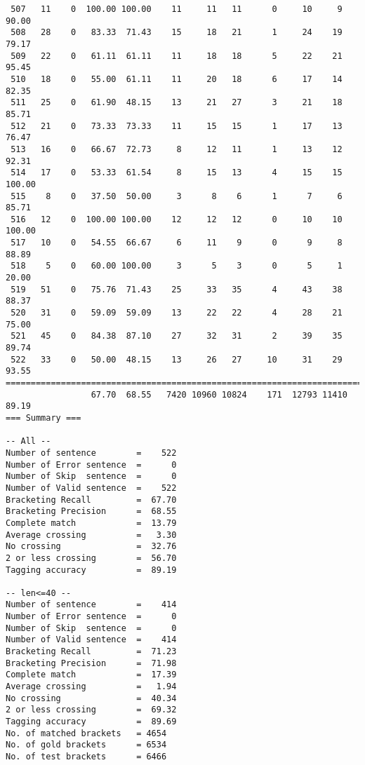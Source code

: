 \begin{verbatim}
 507   11    0  100.00 100.00    11     11   11      0     10     9    90.00
 508   28    0   83.33  71.43    15     18   21      1     24    19    79.17
 509   22    0   61.11  61.11    11     18   18      5     22    21    95.45
 510   18    0   55.00  61.11    11     20   18      6     17    14    82.35
 511   25    0   61.90  48.15    13     21   27      3     21    18    85.71
 512   21    0   73.33  73.33    11     15   15      1     17    13    76.47
 513   16    0   66.67  72.73     8     12   11      1     13    12    92.31
 514   17    0   53.33  61.54     8     15   13      4     15    15   100.00
 515    8    0   37.50  50.00     3      8    6      1      7     6    85.71
 516   12    0  100.00 100.00    12     12   12      0     10    10   100.00
 517   10    0   54.55  66.67     6     11    9      0      9     8    88.89
 518    5    0   60.00 100.00     3      5    3      0      5     1    20.00
 519   51    0   75.76  71.43    25     33   35      4     43    38    88.37
 520   31    0   59.09  59.09    13     22   22      4     28    21    75.00
 521   45    0   84.38  87.10    27     32   31      2     39    35    89.74
 522   33    0   50.00  48.15    13     26   27     10     31    29    93.55
============================================================================
                 67.70  68.55   7420 10960 10824    171  12793 11410    89.19
=== Summary ===

-- All --
Number of sentence        =    522
Number of Error sentence  =      0
Number of Skip  sentence  =      0
Number of Valid sentence  =    522
Bracketing Recall         =  67.70
Bracketing Precision      =  68.55
Complete match            =  13.79
Average crossing          =   3.30
No crossing               =  32.76
2 or less crossing        =  56.70
Tagging accuracy          =  89.19

-- len<=40 --
Number of sentence        =    414
Number of Error sentence  =      0
Number of Skip  sentence  =      0
Number of Valid sentence  =    414
Bracketing Recall         =  71.23
Bracketing Precision      =  71.98
Complete match            =  17.39
Average crossing          =   1.94
No crossing               =  40.34
2 or less crossing        =  69.32
Tagging accuracy          =  89.69
No. of matched brackets   = 4654
No. of gold brackets      = 6534
No. of test brackets      = 6466

\end{verbatim}

\normalsize

